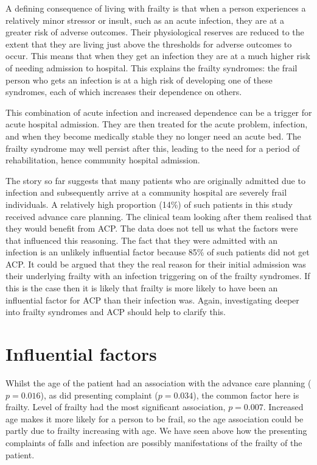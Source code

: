 \documentclass
[
	12pt,
	a4paper,
	oneside,
]{report}
\begin{document}
A defining consequence of living with frailty is that when a person 
experiences a relatively minor stressor or insult, such as an acute infection, 
they are at a greater risk of adverse outcomes. Their physiological reserves
are reduced to the extent that they are living just above the thresholds 
for adverse outcomes to occur. This means that when they get an infection
they are at a much higher risk of needing admission to hospital. This explains
the frailty syndromes: the frail person who gets an infection is at a high 
risk of developing one of these syndromes, each of which increases their 
dependence on others.

This combination of acute infection and increased dependence can be a trigger
for acute hospital admission. They are then treated for the acute problem,
infection, and when they become medically stable they no longer need an acute
bed. The frailty syndrome may well persist after this, leading to the
need for a period of rehabilitation, hence community hospital admission.

The story so far suggests that many patients who are originally admitted 
due to infection and 
subsequently arrive at a community hospital are severely frail individuals.
A relatively high proportion (14\%) of such patients in this study received
advance care planning. The clinical team looking after them realised that they
would benefit from ACP. The data does not tell us what the factors were that 
influenced this reasoning. The fact that they were admitted with an infection
is an unlikely influential factor because 85\% of such patients did not get
ACP. It could be argued that they the real reason for their initial admission
was their underlying frailty with an infection triggering on of the frailty 
syndromes. If this is the case then it is likely that frailty is more likely 
to have been an influential factor for ACP than their infection was. Again, 
investigating deeper into frailty syndromes and ACP should help to clarify 
this.

\section{Influential factors}

Whilst the age of the patient
had an association with the advance care planning ($p=0.016$), as did 
presenting complaint ($p=0.034$),
the common factor here is frailty. Level of frailty had the most 
significant association, $p=0.007$. Increased age makes it more likely for a 
person to be frail, so the age association could be partly due to frailty
increasing with age. We have seen above how the presenting complaints of 
falls and infection are possibly manifestations of the frailty of the patient.
\end{document}
